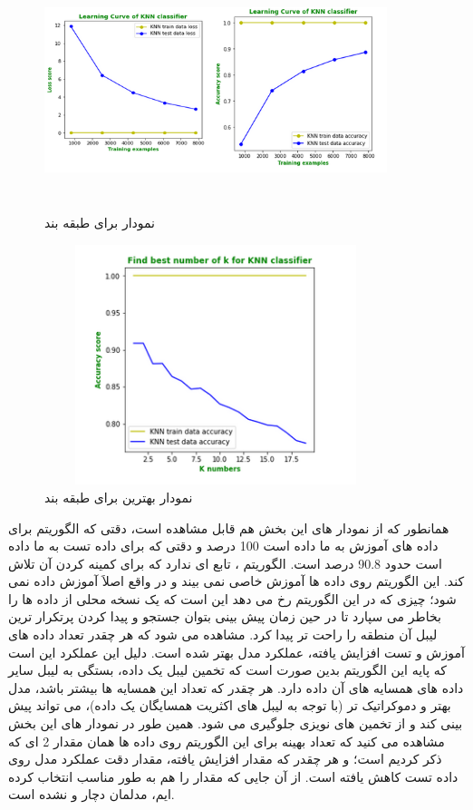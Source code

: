 \documentclass[12pt,onecolumn,a4paper]{article}
\begin{document}
\begin{figure}
  \centering
  \includegraphics[width=10cm,height=7cm,keepaspectratio]{10.png}
  \caption{نمودار  برای طبقه بند }
  \label{fig:LCKNN}
\end{figure}

\begin{figure}
  \centering
  \includegraphics[width=10cm,height=7cm,keepaspectratio]{11.png}
  \caption{نمودار بهترین  برای طبقه بند }
  \label{fig:BestKKNN}
\end{figure}

همانطور که از نمودار های این بخش هم قابل مشاهده است، دقتی که الگوریتم  برای داده های آموزش به ما داده است 100 درصد و دقتی که برای داده تست به ما داده است حدود 90.8 درصد است. الگوریتم ، تابع  ای ندارد که برای کمینه کردن آن تلاش کند. این الگوریتم روی داده ها آموزش خاصی نمی بیند و در واقع اصلاَ آموزش داده نمی شود؛ چیزی که در این الگوریتم رخ می دهد این است که یک نسخه محلی از داده ها را بخاطر می سپارد تا در حین زمان پیش بینی بتوان جستجو و پیدا کردن پرتکرار ترین لیبل آن منطقه را راحت تر پیدا کرد.
مشاهده می شود که هر چقدر تعداد داده های آموزش و تست افزایش یافته، عملکرد مدل بهتر شده است. دلیل این عملکرد این است که پایه این الگوریتم بدین صورت است که تخمین لیبل یک داده، بستگی به لیبل سایر داده های همسایه های آن داده دارد. هر چقدر که تعداد این همسایه ها بیشتر باشد، مدل بهتر و دموکراتیک تر (با توجه به لیبل های اکثریت همسایگان یک داده)، می تواند پیش بینی کند و از تخمین های نویزی جلوگیری می شود.
 همین طور در نمودار های این بخش مشاهده می کنید که تعداد بهینه  برای این الگوریتم روی داده ها همان مقدار 2 ای که ذکر کردیم است؛ و هر چقدر که مقدار  افزایش یافته، مقدار دقت عملکرد مدل روی داده تست کاهش یافته است.
از آن جایی که مقدار  را هم به طور مناسب انتخاب کرده ایم، مدلمان دچار  و  نشده است.
\end{document}
